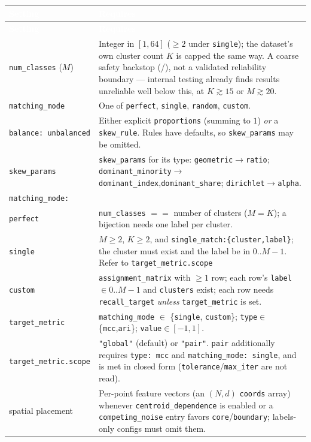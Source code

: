 \documentclass[a4paper,11pt]{article}
\newcommand{\vcode}[1]{\textcolor{valred}{\bfseries\ttfamily #1}}
\newcommand{\headrow}{\rowcolor{headblue}}
\newcommand{\hc}[1]{\textcolor{white}{\bfseries #1}}
\begin{document}
\begin{longtable}{@{}L{4.2cm} L{12.0cm}@{}}
\toprule
\headrow \hc{Setting} & \hc{Requires} \\
\midrule
\endfirsthead
\headrow \hc{Setting} & \hc{Requires} \\ \midrule
\endhead
\texttt{num\_classes} ($M$) & Integer in $[1,64]$ ($\geq 2$ under \texttt{single}); the dataset's own cluster count $K$ is capped the same way. A coarse safety backstop (\vcode{126}/\vcode{127}), not a validated reliability boundary --- internal testing already finds results unreliable well below this, at $K\gtrsim15$ or $M\gtrsim20$. \\
\texttt{matching\_mode} & One of \texttt{perfect}, \texttt{single}, \texttt{random}, \texttt{custom}. \\
\texttt{balance: unbalanced} & Either explicit \texttt{proportions} (summing to $1$) \emph{or} a \texttt{skew\_rule}. Rules have defaults, so \texttt{skew\_params} may be omitted. \\
\texttt{skew\_params} & \texttt{skew\_params} for its type: \texttt{geometric}$\to$\texttt{ratio}; \texttt{dominant\_minority}$\to$\texttt{dominant\_index},\texttt{dominant\_share}; \texttt{dirichlet}$\to$\texttt{alpha}. \\
\texttt{matching\_mode:}\\
\texttt{perfect} & \texttt{num\_classes} $==$ number of clusters ($M=K$); a bijection needs one label per cluster.\\
\texttt{single} & $M\geq2$, $K\geq2$, and \texttt{single\_match:\{cluster,label\}}; the cluster must exist and the label be in $0..M{-}1$. Refer to \texttt{target\_metric.scope} \\
\texttt{custom} & \texttt{assignment\_matrix} with $\geq1$ row; each row's \texttt{label}$\in 0..M{-}1$ and \texttt{clusters} exist; each row needs \texttt{recall\_target} \emph{unless} \texttt{target\_metric} is set. \\
\texttt{target\_metric} & \texttt{matching\_mode} $\in$ \{\texttt{single}, \texttt{custom}\}; \texttt{type}$\in$\{\texttt{mcc},\texttt{ari}\}; \texttt{value}$\in[-1,1]$. \\
\texttt{target\_metric.scope} & \texttt{"global"} (default) or \texttt{"pair"}. \texttt{pair} additionally requires \texttt{type: mcc} and \texttt{matching\_mode: single}, and is met in closed form (\texttt{tolerance}/\texttt{max\_iter} are not read). \\
spatial placement & Per-point feature vectors (an $(N,d)$ \texttt{coords} array) whenever \texttt{centroid\_dependence} is enabled or a \texttt{competing\_noise} entry favors \texttt{core}/\texttt{boundary}; labels-only configs must omit them. \\

\end{longtable}
\end{document}

